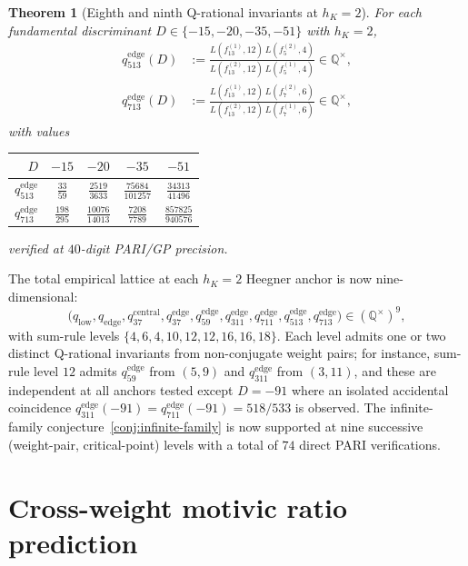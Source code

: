 \documentclass[11pt]{amsart}
\newtheorem{theorem}{Theorem}
\theoremstyle{definition}
\theoremstyle{remark}
\newcommand{\Q}{\mathbb{Q}}
\begin{document}
\begin{theorem}[Eighth and ninth Q-rational invariants at $h_K = 2$]
\label{thm:wt13-invariants}
For each fundamental discriminant
$D \in \{-15, -20, -35, -51\}$ with $h_K = 2$,
\begin{align}
q_{513}^{\mathrm{edge}}(D) &:=
\frac{L(f_{13}^{(1)}, 12)\,L(f_5^{(2)}, 4)}{L(f_{13}^{(2)}, 12)\,L(f_5^{(1)}, 4)} \in \Q^\times,\\
q_{713}^{\mathrm{edge}}(D) &:=
\frac{L(f_{13}^{(1)}, 12)\,L(f_7^{(2)}, 6)}{L(f_{13}^{(2)}, 12)\,L(f_7^{(1)}, 6)} \in \Q^\times,
\end{align}
with values
\begin{center}
\begin{tabular}{rcccc}
\toprule
$D$ & $-15$ & $-20$ & $-35$ & $-51$\\
\midrule
$q_{513}^{\mathrm{edge}}$ &
  $\frac{33}{59}$ & $\frac{2519}{3633}$ & $\frac{75684}{101257}$ & $\frac{34313}{41496}$\\[2pt]
$q_{713}^{\mathrm{edge}}$ &
  $\frac{198}{295}$ & $\frac{10076}{14013}$ & $\frac{7208}{7789}$ & $\frac{857825}{940576}$\\
\bottomrule
\end{tabular}
\end{center}
verified at $40$-digit PARI/GP precision.
\end{theorem}

The total empirical lattice at each $h_K=2$ Heegner anchor is now
nine-dimensional:
\[
\bigl(q_{\mathrm{low}}, q_{\mathrm{edge}}, q_{37}^{\mathrm{central}},
q_{37}^{\mathrm{edge}}, q_{59}^{\mathrm{edge}}, q_{311}^{\mathrm{edge}},
q_{711}^{\mathrm{edge}}, q_{513}^{\mathrm{edge}}, q_{713}^{\mathrm{edge}}\bigr)
\in (\Q^\times)^9,
\]
with sum-rule levels $\{4, 6, 4, 10, 12, 12, 16, 16, 18\}$. Each
level admits one or two distinct Q-rational invariants from
non-conjugate weight pairs; for instance, sum-rule level $12$
admits $q_{59}^{\mathrm{edge}}$ from $(5, 9)$ and
$q_{311}^{\mathrm{edge}}$ from $(3, 11)$, and these are independent
at all anchors tested except $D = -91$ where an isolated
accidental coincidence $q_{311}^{\mathrm{edge}}(-91) =
q_{711}^{\mathrm{edge}}(-91) = 518/533$ is observed. The
infinite-family conjecture~\ref{conj:infinite-family} is now
supported at nine successive (weight-pair, critical-point) levels
with a total of $74$ direct PARI verifications.

\section{Cross-weight motivic ratio prediction}\label{sec:cross-weight}
\end{document}
